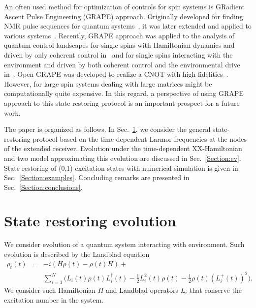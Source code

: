 \documentclass[pra,preprint,showpacs]{revtex4-1}
\begin{document}
An often used method for optimization of controls for spin systems is GRadient Ascent Pulse Engineering (GRAPE) approach. {Originally developed for finding NMR pulse sequences for quantum systems}~\cite{Khaneja2005}, it was later extended and applied to various systems~\cite{GlaserJPB2011,Fouquieres2011,PechenTannor2011,Lucarelli2018,PP_2023}. Recently, GRAPE approach was applied to the analysis of quantum control landscapes for single spins with Hamiltonian dynamics and driven by only coherent control in~\cite{VMP_21} and for single spins interacting with the environment and driven by both coherent control and the environmental drive in~\cite{PP_2023}. Open GRAPE was developed to realize a CNOT with high fidelities~\cite{GlaserJPB2011}. However, for large spin systems dealing with large matrices might be computationally quite expensive. In this regard, a perspective of using GRAPE approach to this state restoring protocol is an important prospect for a future work.

The paper is organized as follows. In Sec.~\ref{Section:T}, we consider the general state-restoring protocol based on the time-dependent Larmor frequencies at the nodes of the extended receiver. Evolution under the time-dependent XX-Hamiltonian and two model approximating this evolution are discussed in Sec.~\ref{Section:ev}. State restoring of (0,1)-excitation states with numerical simulation is given in Sec.~\ref{Section:examples}. Concluding remarks are presented in Sec.~\ref{Section:conclusions}.



\section{State restoring evolution}
\label{Section:T}

We consider evolution of a quantum system interacting with 	environment. Such evolution is described by the  Landblad equation
\begin{eqnarray}\label{rho0}
 \rho_t(t)&=&-i (H\rho(t) - \rho(t) H) +\\\nonumber
&& \sum_{i=1}^N \Big(L_i(t) \rho(t) L_i^\dagger(t)
-\frac{1}{2} L_i^2(t)\rho(t) -\frac{1}{2} \rho(t) (L_i^+(t))^2\Big).
\end{eqnarray}
We consider such Hamiltonian $H$ and Landblad operators $L_i$ that conserve the excitation number in the system.


\iffalse
Governed by some Hamiltonian $H$ evolution of a density matrix $\rho$ is described by the Liouville-von Neumann equation (where we set Planck constant $\hbar=1$):
\begin{eqnarray}\label{rho}
i \rho_t(t) = [H(t),\rho(t)]=H(t)\rho(t) - \rho(t) H(t).
\end{eqnarray}
If $H(t)=H_0$ is independent on $t$, then this equation can be simply integrated:
\begin{eqnarray}
\rho(t)=e^{-iH_0 t} \rho(0) e^{iH_0 t},
\end{eqnarray}
where $\rho(0)$ is the initial state. Otherwise, the analytical solution is given by the time-ordered (chronological)  exponent and generically can be explicitly solved using numerical methods.
\fi
\end{document}
